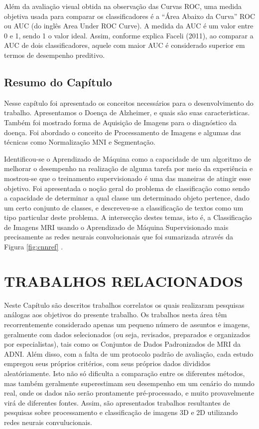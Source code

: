 \documentclass[openright]{UFRGS} %
\begin{document}
Além da avaliação visual obtida na observação das Curvas ROC, uma medida
objetiva usada para comparar os classificadores é a “Área Abaixo da Curva” ROC ou AUC (do inglês Area Under ROC Curve). A medida da AUC é um valor entre 0 e 1, sendo 1 o valor ideal. Assim, conforme explica Faceli (2011), ao comparar a AUC de dois
classificadores, aquele com maior AUC é considerado superior em termos de desempenho preditivo.


\section{Resumo do Capítulo}

Nesse capítulo foi apresentado os conceitos necessários para o desenvolvimento do trabalho. Apresentamos o Doença de Alzheimer, e quais são suas caracteristicas. Também foi mostrado forma de Aquisição de Imagens para o diagnóstico da doença. Foi abordado o conceito de Processamento de Imagens e algumas das técnicas como Normalização MNI e Segmentação.

Identificou-se o Aprendizado de Máquina como a capacidade de um algoritmo
de melhorar o desempenho na realização de alguma tarefa por meio da experiência e
mostrou-se que o treinamento supervisionado é uma das maneiras de atingir esse objetivo.
Foi apresentada o noção geral do problema de classificação como sendo a capacidade de
determinar a qual classe um determinado objeto pertence, dado um certo conjunto de
classes, e descreveu-se a classificação de textos como um tipo particular deste problema.
A intersecção destes temas, isto é, a Classificação de Imagens MRI usando o Aprendizado de
Máquina Supervisionado mais precisamente as redes neurais convolucionais que foi sumarizada através da Figura \ref{fig:cnnref} .




\chapter{TRABALHOS RELACIONADOS}

Neste Capítulo são descritos trabalhos correlatos os quais realizaram pesquisas análogas
aos objetivos do presente trabalho. Os trabalhos nesta área têm recorrentemente considerado apenas um pequeno número de assuntos e
imagens, geralmente com dados selecionados (ou seja, revisados, preparados e organizados por especialistas), tais
como os Conjuntos de Dados Padronizados de MRI da ADNI. Além disso, com a falta de um protocolo padrão de avaliação, cada estudo empregou seus próprios critérios, com seus próprios dados divididos aleatóriamente. Isto não só dificulta a comparação entre os diferentes métodos, mas também geralmente
superestimam seu desempenho em um cenário do mundo real, onde os dados não serão prontamente
pré-processado, e muito provavelmente virá de diferentes fontes. 
Assim, são apresentados trabalhos resultantes de pesquisas sobre  processamento e classificação de imagens 3D e 2D utilizando  redes neurais convulucionais.
\end{document}

